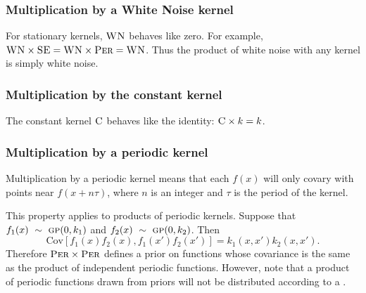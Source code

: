 \documentclass{article} %
\begin{document}
\subsubsection{Multiplication by a White Noise kernel}
\vspace{-0.1in}

For stationary kernels, ${\textsc{WN}}$ behaves like zero.  For example, ${\textsc{WN}} \times {\textsc{SE}} = {\textsc{WN}} \times {\textsc{Per}} = {\textsc{WN}}$.  Thus the product of white noise with any kernel is simply white noise.


\subsubsection{Multiplication by the constant kernel}
\vspace{-0.1in}

The constant kernel ${\textsc{C}}$ behaves like the identity: ${\textsc{C}} \times k = k$.


\subsubsection{Multiplication by a periodic kernel}
\vspace{-0.1in}

Multiplication by a periodic kernel means that each $f(x)$ will only covary with points near $f(x + n \tau)$, where $n$ is an integer and $\tau$ is the period of the kernel.

This property applies to products of periodic kernels.
Suppose that ${f_1(x) \ \sim\  {\textsc{gp}}{}(0, k_1)}$ and ${f_2(x) \ \sim\  {\textsc{gp}}{}(0, k_2)}$.
Then
\begin{equation}
{\textrm{Cov} \left[f_1(x)f_2(x), f_1(x')f_2(x') \right] = k_1(x,x')k_2(x,x')}.
\end{equation}
Therefore ${\textsc{Per}} \times {\textsc{Per}}$ defines a prior on functions whose covariance is the same as the product of independent periodic functions.  However, note that a product of periodic functions drawn from \gp{} priors will not be distributed according to a \gp{}.

\end{document}
